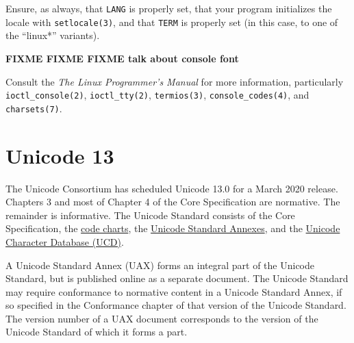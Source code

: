 \documentclass[letterpaper,10pt]{article}
\begin{document}
\begin{appendices}
Ensure, as always, that \texttt{LANG} is properly set, that your program
initializes the locale with \texttt{setlocale(3)}, and that \texttt{TERM} is
properly set (in this case, to one of the ``linux*'' variants).

\textbf{FIXME FIXME FIXME talk about console font}

Consult the \textit{The Linux Programmer's Manual} for more information,
particularly
\texttt{ioctl\_console(2)}\cite{ioctlconsole},
\texttt{ioctl\_tty(2)}\cite{ioctltty},
\texttt{termios(3)}\cite{termios},
\texttt{console\_codes(4)}\cite{consolecodes},
and
\texttt{charsets(7)}\cite{charsets7}.

\newpage
\section{Unicode 13}
The Unicode Consortium has scheduled Unicode 13.0 for a March 2020 release.
Chapters 3 and most of Chapter 4 of the Core Specification are normative. The
remainder is informative. The Unicode Standard consists of the Core
Specification\cite{unicode13}, the \href{https://www.unicode.org/charts/}{code charts},
the \href{https://unicode.org/versions/Unicode13.0.0/#Unicode_Standard_Annexes_nb}{Unicode Standard Annexes},
and the \href{http://www.unicode.org/Public/13.0.0/}{Unicode Character Database (UCD)}.

A Unicode Standard Annex (UAX) forms an integral part of the Unicode Standard,
but is published online as a separate document. The Unicode Standard may
require conformance to normative content in a Unicode Standard Annex, if so
specified in the Conformance chapter of that version of the Unicode Standard.
The version number of a UAX document corresponds to the version of the Unicode
Standard of which it forms a part.


\end{appendices}
\end{document}

